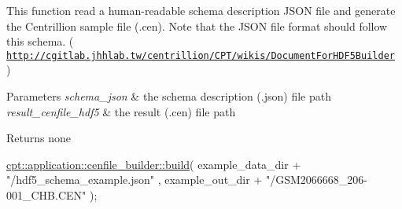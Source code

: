 This function read a human-\/readable schema description J\-S\-O\-N file and generate the Centrillion sample file (.cen). Note that the J\-S\-O\-N file format should follow this schema. ( \href{http://cgitlab.jhhlab.tw/centrillion/CPT/wikis/DocumentForHDF5Builder}{\tt http\-://cgitlab.\-jhhlab.\-tw/centrillion/\-C\-P\-T/wikis/\-Document\-For\-H\-D\-F5\-Builder} )


\begin{DoxyParams}{Parameters}
{\em schema\-\_\-json} & the schema description (.json) file path \\
\hline
{\em result\-\_\-cenfile\-\_\-hdf5} & the result (.cen) file path \\
\hline
\end{DoxyParams}
\begin{DoxyReturn}{Returns}
none
\end{DoxyReturn}

\begin{DoxyCodeInclude}
    \hyperlink{namespacecpt_1_1application_1_1cenfile__builder_a2a8bcd0f47ababa94240e923be133a0d}{cpt::application::cenfile\_builder::build}(
          example\_data\_dir + \textcolor{stringliteral}{"/hdf5\_schema\_example.json"}
        , example\_out\_dir + \textcolor{stringliteral}{"/GSM2066668\_206-001\_CHB.CEN"}
    );
\end{DoxyCodeInclude}
